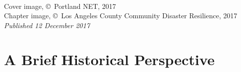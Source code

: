 \documentclass[11pt,fleqn]{book} %
\begin{document}
\newpage
~\vfill
\thispagestyle{empty}

\noindent Cover image, \copyright\ Portland NET, 2017\\ %
\noindent Chapter image, \copyright\ Los Angeles County Community Disaster Resilience, 2017\\ %
\noindent \textit{Published 12 December 2017} %






\pagestyle{empty} %

\renewcommand\contentsname{Table of Contents}
\renewcommand{\bibname}{Bibliography}
\tableofcontents%


\pagestyle{fancy} %

\chapter{A Brief Historical Perspective}
\end{document}
